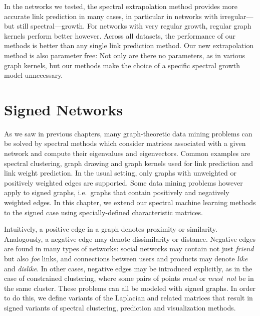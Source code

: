 \documentclass[11pt,a4paper]{book}
\begin{document}
In the networks we tested, the spectral extrapolation method provides
more accurate link prediction in many cases, in particular in networks
with irregular---but still spectral---growth.  For networks with very
regular growth, regular graph kernels perform better however.  Across
all datasets, the performance of our methods is better than any single
link prediction method.  Our new extrapolation method is also parameter
free: Not only are there no parameters, as in various graph kernels, but
our methods make the choice of a specific spectral growth model
unnecessary.

\chapter{Signed Networks}
\label{chap:signed}
As we saw in previous chapters, many graph-theoretic data mining
problems can be solved by spectral 
methods which consider matrices associated with a given
network and compute their eigenvalues and eigenvectors.  Common
examples are spectral clustering, graph drawing and graph kernels used
for link prediction and link weight prediction.  In the usual setting,
only graphs with unweighted or positively weighted edges are supported.
Some data mining problems however apply to signed graphs, i.e.\ graphs
that contain positively and negatively weighted edges.  In this chapter,
we extend our spectral machine learning methods to
the signed case using specially-defined characteristic matrices.

Intuitively, a positive edge in a graph denotes proximity or similarity.
Analogously, a negative edge may denote dissimilarity or distance.  Negative
edges are found in many types of networks: social networks may contain
not just \emph{friend} but also \emph{foe} links, and connections between users
and products may denote \emph{like} and \emph{dislike}.  In other cases, negative
edges may be introduced explicitly, as in the case of constrained
clustering, where some pairs of points \emph{must} or \emph{must~not} be
in the same cluster.  These problems can all be modeled with signed
graphs.
In order to do this, we define variants of the Laplacian and related
matrices that result in signed variants of
spectral clustering, prediction and visualization methods.
\end{document}
